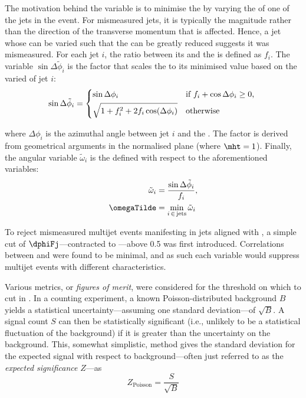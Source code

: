 The motivation behind the variable \omegaTilde is to minimise the \mht by varying the \pt of one of the \glspl{jet} in the event. For mismeasured \glspl{jet}, it is typically the magnitude rather than the direction of the transverse momentum that is affected. Hence, a \gls{jet} whose \pt can be varied such that the \mht can be greatly reduced suggests it was mismeasured. For each jet $i$, the ratio between its \pt and the \mht is defined as $f_i$. The variable $\sin\Delta\tilde{\phi}_i$ is the factor that scales the \mht to its minimised value based on the varied \pt of jet $i$:
\begin{align}
\sin\Delta\tilde{\phi}_i = \begin{dcases*}
\sin\Delta\phi_i & if $f_i + \cos\Delta\phi_i \geq 0$, \\
\sqrt{1 + f_i^2 + 2 f_i \cos(\Delta\phi_i)} & otherwise\\
\end{dcases*}
\end{align}

where $\Delta\phi_i$ is the azimuthal angle between \gls{jet} $i$ and the \htvecmiss. The factor is derived from geometrical arguments in the normalised \pt plane (where $\mht = \text{1}$). Finally, the angular variable $\tilde{\omega}_i$ is the defined with respect to the aforementioned variables:
\begin{equation}
    \begin{aligned}
\tilde{\omega}_i &= \frac{ \sin\Delta\tilde{\phi}_i }{ f_i },\\
\omegaTilde &= \min_{i \, \in \, \mathrm{jets}} \tilde{\omega}_i
    \end{aligned}
\end{equation}

To reject mismeasured multijet events manifesting in \glspl{jet} aligned with \ptmiss, a simple cut of $\dphiFj$---contracted to \mindphi---above 0.5 was first introduced. Correlations between \mindphi and \omegaTilde were found to be minimal, and as such each variable would suppress multijet events with different characteristics.

Various metrics, or \emph{figures of merit}, were considered for the threshold on which to cut in \omegaTilde. In a counting experiment, a known Poisson-distributed background $B$ yields a statistical uncertainty---assuming one standard deviation---of $\sqrt{B}$. A signal count $S$ can then be statistically significant (i.e., unlikely to be a statistical fluctuation of the background) if it is greater than the uncertainty on the background. This, somewhat simplistic, method gives the standard deviation for the expected signal with respect to background---often just referred to as the \emph{expected significance} $Z$---as
\begin{equation}
Z_{\mathrm{Poisson}} = \frac{S}{\sqrt{B}}
\label{eq:s_over_root_b}
\end{equation}

